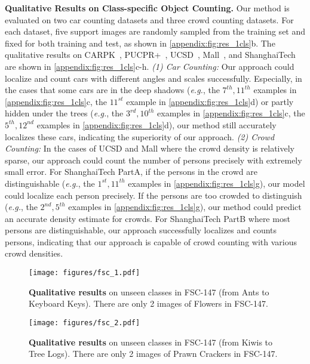 \documentclass[10pt,twocolumn,letterpaper]{article}
\begin{document}
\vspace{2pt}\noindent\textbf{Qualitative Results on Class-specific Object Counting.}
Our method is evaluated on two car counting datasets and three crowd counting datasets. 
For each dataset, five support images are randomly sampled from the training set and fixed for both training and test, as shown in \cref{appendix:fig:res_1cls}b. 
The qualitative results on CARPK~\cite{lpn}, PUCPR+~\cite{lpn}, UCSD~\cite{ucsd}, Mall~\cite{mall}, and ShanghaiTech~\cite{mcnn} are shown in \cref{appendix:fig:res_1cls}c-h. 
\textit{(1) Car Counting:} Our approach could localize and count cars with different angles and scales successfully. 
Especially, in the cases that some cars are in the deep shadows (\textit{e.g.}, the $7^{th}, 11^{th}$ examples in \cref{appendix:fig:res_1cls}c, the $11^{st}$ example in \cref{appendix:fig:res_1cls}d) or partly hidden under the trees (\textit{e.g.}, the $3^{rd}, 10^{th}$ examples in \cref{appendix:fig:res_1cls}c, the $5^{th}, 12^{nd}$ examples in \cref{appendix:fig:res_1cls}d), our method still accurately localizes these cars, indicating the superiority of our approach.
\textit{(2) Crowd Counting:} In the cases of UCSD and Mall where the crowd density is relatively sparse, our approach could count the number of persons precisely with extremely small error. 
For ShanghaiTech PartA, if the persons in the crowd are distinguishable (\textit{e.g.}, the $1^{st}, 11^{th}$ examples in \cref{appendix:fig:res_1cls}g), our model could localize each person precisely. If the persons are too crowded to distinguish (\textit{e.g.}, the $2^{nd}, 5^{th}$ examples in \cref{appendix:fig:res_1cls}g), our method could predict an accurate density estimate for crowds. 
For ShanghaiTech PartB where most persons are distinguishable, our approach successfully localizes and counts persons, indicating that our approach is capable of crowd counting with various crowd densities. 

 \begin{figure*}[htbp]
\begin{minipage}{1\linewidth}
\centering
\texttt{[image: figures/fsc\_1.pdf]}
\end{minipage}
\vspace{-2pt}
\caption{\textbf{Qualitative results} on unseen classes in FSC-147 (from Ants to Keyboard Keys). There are only 2 images of Flowers in FSC-147.}
\label{appendix:fig:fsc_1}
\end{figure*}


\begin{figure*}[htbp]
\begin{minipage}{1\linewidth}
\centering
\texttt{[image: figures/fsc\_2.pdf]}
\end{minipage}
\vspace{-2pt}
\caption{\textbf{Qualitative results} on unseen classes in FSC-147 (from Kiwis to Tree Logs). There are only 2 images of Prawn Crackers in FSC-147.}
\label{appendix:fig:fsc_2}
\end{figure*}
\end{document}
